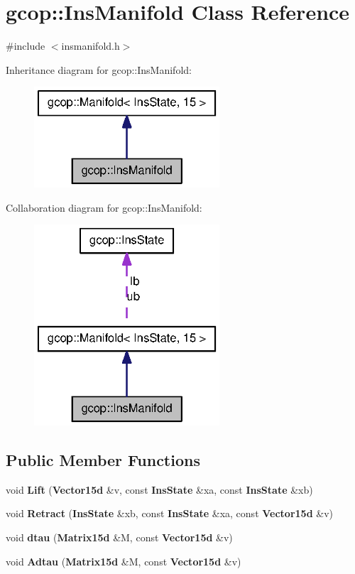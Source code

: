\section{gcop\-:\-:\-Ins\-Manifold \-Class \-Reference}
\label{classgcop_1_1InsManifold}


{\ttfamily \#include $<$insmanifold.\-h$>$}



\-Inheritance diagram for gcop\-:\-:\-Ins\-Manifold\-:\nopagebreak
\begin{figure}[H]
\begin{center}
\leavevmode
\includegraphics[width=196pt]{classgcop_1_1InsManifold__inherit__graph}
\end{center}
\end{figure}


\-Collaboration diagram for gcop\-:\-:\-Ins\-Manifold\-:\nopagebreak
\begin{figure}[H]
\begin{center}
\leavevmode
\includegraphics[width=196pt]{classgcop_1_1InsManifold__coll__graph}
\end{center}
\end{figure}
\subsection*{\-Public \-Member \-Functions}
\begin{DoxyCompactItemize}
\item 
void {\bf \-Lift} ({\bf \-Vector15d} \&v, const {\bf \-Ins\-State} \&xa, const {\bf \-Ins\-State} \&xb)
\item 
void {\bf \-Retract} ({\bf \-Ins\-State} \&xb, const {\bf \-Ins\-State} \&xa, const {\bf \-Vector15d} \&v)
\item 
void {\bf dtau} ({\bf \-Matrix15d} \&\-M, const {\bf \-Vector15d} \&v)
\item 
void {\bf \-Adtau} ({\bf \-Matrix15d} \&\-M, const {\bf \-Vector15d} \&v)
\end{DoxyCompactItemize}
